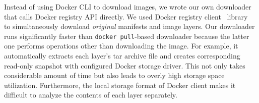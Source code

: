 %
Instead of using Docker CLI to download images,
we wrote our own downloader that calls Docker registry API directly.
We used Docker registry client~ library~\cite{dockerregistryclient} to simultaneously
download \emph{original} manifests and image layers. 
%
%
%
%
%
Our downloader runs significantly
faster than \texttt{docker pull}-based downloader
because the latter one performs
operations other than downloading the
image.
%
For example, it automatically extracts each layer's tar archive file
and creates corresponding read-only snapshot with  configured Docker storage driver.
This
not only takes considerable amount of time but also leads
to overly high storage space utilization.
%
%
Furthermore, the local storage format of Docker client makes it difficult
to analyze the contents of each layer separately.
%
%

